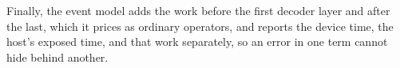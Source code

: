 Finally, the event model adds the work before the first decoder layer and after the last, which it prices as ordinary operators, and reports the device time, the host's exposed time, and that work separately, so an error in one term cannot hide behind another.

